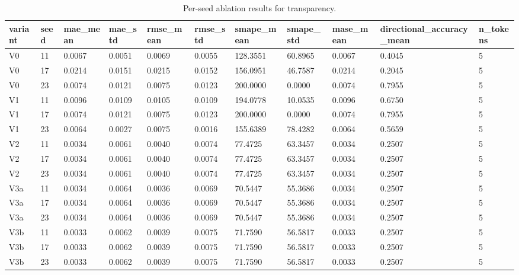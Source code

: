 \begin{table}[htbp]
\centering
\begin{tabular}{lllllllllll}
\hline
variant & seed & mae_mean & mae_std & rmse_mean & rmse_std & smape_mean & smape_std & mase_mean & directional_accuracy_mean & n_tokens \\
\hline
V0 & 11 & 0.0067 & 0.0051 & 0.0069 & 0.0055 & 128.3551 & 60.8965 & 0.0067 & 0.4045 & 5 \\
V0 & 17 & 0.0214 & 0.0151 & 0.0215 & 0.0152 & 156.0951 & 46.7587 & 0.0214 & 0.2045 & 5 \\
V0 & 23 & 0.0074 & 0.0121 & 0.0075 & 0.0123 & 200.0000 & 0.0000 & 0.0074 & 0.7955 & 5 \\
V1 & 11 & 0.0096 & 0.0109 & 0.0105 & 0.0109 & 194.0778 & 10.0535 & 0.0096 & 0.6750 & 5 \\
V1 & 17 & 0.0074 & 0.0121 & 0.0075 & 0.0123 & 200.0000 & 0.0000 & 0.0074 & 0.7955 & 5 \\
V1 & 23 & 0.0064 & 0.0027 & 0.0075 & 0.0016 & 155.6389 & 78.4282 & 0.0064 & 0.5659 & 5 \\
V2 & 11 & 0.0034 & 0.0061 & 0.0040 & 0.0074 & 77.4725 & 63.3457 & 0.0034 & 0.2507 & 5 \\
V2 & 17 & 0.0034 & 0.0061 & 0.0040 & 0.0074 & 77.4725 & 63.3457 & 0.0034 & 0.2507 & 5 \\
V2 & 23 & 0.0034 & 0.0061 & 0.0040 & 0.0074 & 77.4725 & 63.3457 & 0.0034 & 0.2507 & 5 \\
V3a & 11 & 0.0034 & 0.0064 & 0.0036 & 0.0069 & 70.5447 & 55.3686 & 0.0034 & 0.2507 & 5 \\
V3a & 17 & 0.0034 & 0.0064 & 0.0036 & 0.0069 & 70.5447 & 55.3686 & 0.0034 & 0.2507 & 5 \\
V3a & 23 & 0.0034 & 0.0064 & 0.0036 & 0.0069 & 70.5447 & 55.3686 & 0.0034 & 0.2507 & 5 \\
V3b & 11 & 0.0033 & 0.0062 & 0.0039 & 0.0075 & 71.7590 & 56.5817 & 0.0033 & 0.2507 & 5 \\
V3b & 17 & 0.0033 & 0.0062 & 0.0039 & 0.0075 & 71.7590 & 56.5817 & 0.0033 & 0.2507 & 5 \\
V3b & 23 & 0.0033 & 0.0062 & 0.0039 & 0.0075 & 71.7590 & 56.5817 & 0.0033 & 0.2507 & 5 \\
\hline
\end{tabular}
\caption{Per-seed ablation results for transparency.}
\label{table_ablation_per_seed}
\end{table}